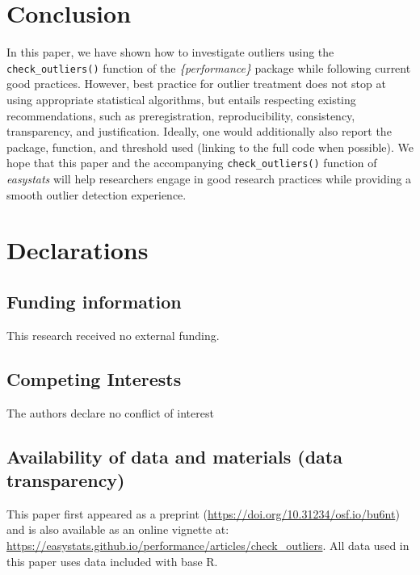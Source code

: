 \documentclass[sn-basic, lineno,pdflatex]{sn-jnl}
\begin{document}
\section{Conclusion}\label{conclusion}

In this paper, we have shown how to investigate outliers using the
\texttt{check\_outliers()} function of the \emph{\{performance\}}
package while following current good practices. However, best practice
for outlier treatment does not stop at using appropriate statistical
algorithms, but entails respecting existing recommendations, such as
preregistration, reproducibility, consistency, transparency, and
justification. Ideally, one would additionally also report the package,
function, and threshold used (linking to the full code when possible).
We hope that this paper and the accompanying \texttt{check\_outliers()}
function of \emph{easystats} will help researchers engage in good
research practices while providing a smooth outlier detection
experience.

\section{Declarations}\label{declarations}

\subsection{Funding information}\label{funding-information}

This research received no external funding.

\subsection{Competing Interests}\label{competing-interests}

The authors declare no conflict of interest

\subsection{Availability of data and materials (data
transparency)}\label{availability-of-data-and-materials-data-transparency}

This paper first appeared as a preprint
(\url{https://doi.org/10.31234/osf.io/bu6nt}) and is also available as
an online vignette at:
\url{https://easystats.github.io/performance/articles/check_outliers}.
All data used in this paper uses data included with base R.
\end{document}
